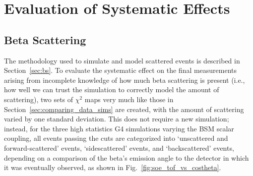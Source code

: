 


\FloatBarrier
\section{Evaluation of Systematic Effects}
\label{section:systematics}
\subsection{Beta Scattering}
\label{section:scattering_systematics}
The methodology used to simulate and model scattered events is described in Section~\ref{sec:bs}.  To evaluate the systematic effect on the final measurements arising from incomplete knowledge of how much beta scattering is present (i.e., how well we can trust the simulation to correctly model the amount of scattering), 
two sets of $\chi^2$ maps very much like those in Section~\ref{sec:comparing_data_sims} are created, with the amount of scattering varied by one standard deviation.  This does not require a new simulation;  instead, for the three high statistics G4 simulations varying the BSM scalar coupling, all events passing the cuts are categorized into `unscattered and forward-scattered' events, `sidescattered' events, and `backscattered' events, depending on a comparison of the beta's emission angle to the detector in which it was eventually observed, as shown in Fig.~\ref{fig:soe_tof_vs_costheta}.

